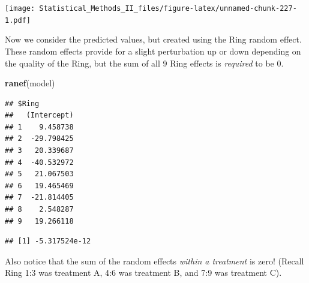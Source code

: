 \documentclass[]{book}
\newenvironment{Shaded}{\begin{snugshade}}{\end{snugshade}}
\newcommand{\KeywordTok}[1]{\textcolor[rgb]{0.13,0.29,0.53}{\textbf{{#1}}}}
\newcommand{\DataTypeTok}[1]{\textcolor[rgb]{0.13,0.29,0.53}{{#1}}}
\newcommand{\DecValTok}[1]{\textcolor[rgb]{0.00,0.00,0.81}{{#1}}}
\newcommand{\FloatTok}[1]{\textcolor[rgb]{0.00,0.00,0.81}{{#1}}}
\newcommand{\StringTok}[1]{\textcolor[rgb]{0.31,0.60,0.02}{{#1}}}
\newcommand{\CommentTok}[1]{\textcolor[rgb]{0.56,0.35,0.01}{\textit{{#1}}}}
\newcommand{\NormalTok}[1]{{#1}}
\theoremstyle{definition}
\theoremstyle{definition}
\theoremstyle{remark}
\begin{document}
\texttt{[image: Statistical\_Methods\_II\_files/figure-latex/unnamed-chunk-227-1.pdf]}

Now we consider the predicted values, but created using the Ring random
effect. These random effects provide for a slight perturbation up or
down depending on the quality of the Ring, but the sum of all 9 Ring
effects is \emph{required} to be 0.

\begin{Shaded}
\begin{Highlighting}[]
\KeywordTok{ranef}\NormalTok{(model)}
\end{Highlighting}
\end{Shaded}

\begin{verbatim}
## $Ring
##   (Intercept)
## 1    9.458738
## 2  -29.798425
## 3   20.339687
## 4  -40.532972
## 5   21.067503
## 6   19.465469
## 7  -21.814405
## 8    2.548287
## 9   19.266118
\end{verbatim}

\begin{Shaded}
\end{Shaded}

\begin{verbatim}
## [1] -5.317524e-12
\end{verbatim}

Also notice that the sum of the random effects \emph{within a treatment}
is zero! (Recall Ring 1:3 was treatment A, 4:6 was treatment B, and 7:9
was treatment C).

\begin{Shaded}
\end{Shaded}
\end{document}
